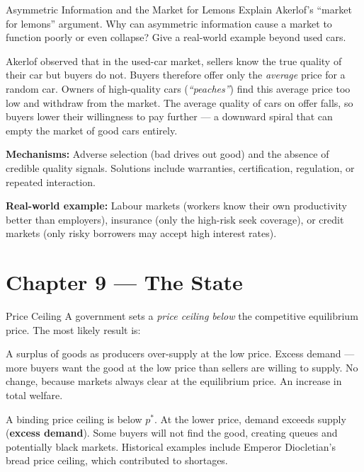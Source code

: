 \documentclass[paper=a5]{scrartcl}
\begin{document}
\begin{question}[type=open]{Asymmetric Information and the Market for Lemons}
Explain Akerlof's ``market for lemons'' argument. Why can asymmetric
information cause a market to function poorly or even collapse? Give a
real-world example beyond used cars.

\answerlines[7]

\begin{solution}
  Akerlof observed that in the used-car market, sellers know the true quality
  of their car but buyers do not. Buyers therefore offer only the \emph{average}
  price for a random car. Owners of high-quality cars (\emph{``peaches''})
  find this average price too low and withdraw from the market. The average
  quality of cars on offer falls, so buyers lower their willingness to pay
  further — a downward spiral that can empty the market of good cars entirely.

  \textbf{Mechanisms:} Adverse selection (bad drives out good) and the absence
  of credible quality signals. Solutions include warranties, certification,
  regulation, or repeated interaction.

  \textbf{Real-world example:} Labour markets (workers know their own
  productivity better than employers), insurance (only the high-risk seek
  coverage), or credit markets (only risky borrowers may accept high interest
  rates).
\end{solution}
\end{question}


\section{Chapter 9 — The State}

\begin{question}[type=mc]{Price Ceiling}
A government sets a \emph{price ceiling below} the competitive equilibrium price.
The most likely result is:
\begin{choices}
  \choice        A surplus of goods as producers over-supply at the low price.
  \correctchoice Excess demand — more buyers want the good at the low price than
                 sellers are willing to supply.
  \choice        No change, because markets always clear at the equilibrium price.
  \choice        An increase in total welfare.
\end{choices}
\begin{solution}
  A binding price ceiling is below $p^*$. At the lower price, demand exceeds
  supply (\textbf{excess demand}). Some buyers will not find the good, creating
  queues and potentially black markets. Historical examples include Emperor
  Diocletian's bread price ceiling, which contributed to shortages.
\end{solution}
\end{question}
\end{document}
